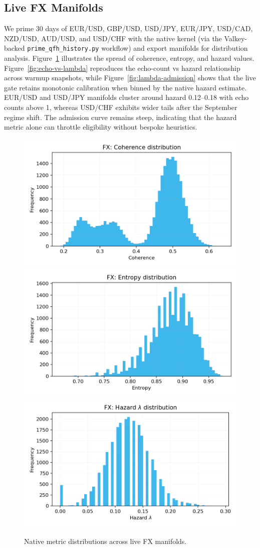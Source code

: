\documentclass[11pt]{article}
\begin{document}
\subsection{Live FX Manifolds}
We prime 30 days of EUR/USD, GBP/USD, USD/JPY, EUR/JPY, USD/CAD, NZD/USD, AUD/USD, and USD/CHF with the native kernel (via the Valkey-backed \texttt{prime\_qfh\_history.py} workflow) and export manifolds for distribution analysis. Figure~\ref{fig:fx-metrics} illustrates the spread of coherence, entropy, and hazard values. Figure~\ref{fig:echo-vs-lambda} reproduces the echo-count vs hazard relationship across warmup snapshots, while Figure~\ref{fig:lambda-admission} shows that the live gate retains monotonic calibration when binned by the native hazard estimate. EUR/USD and USD/JPY manifolds cluster around hazard 0.12--0.18 with echo counts above 1, whereas USD/CHF exhibits wider tails after the September regime shift. The admission curve remains steep, indicating that the hazard metric alone can throttle eligibility without bespoke heuristics.

\begin{figure}[t]
  \centering
  \includegraphics[width=0.32\linewidth]{../figures/fx_metrics/fx_coherence_hist.png}
  \includegraphics[width=0.32\linewidth]{../figures/fx_metrics/fx_entropy_hist.png}
  \includegraphics[width=0.32\linewidth]{../figures/fx_metrics/fx_lambda_hist.png}
  \caption{Native metric distributions across live FX manifolds.}
  \label{fig:fx-metrics}
\end{figure}
\end{document}
